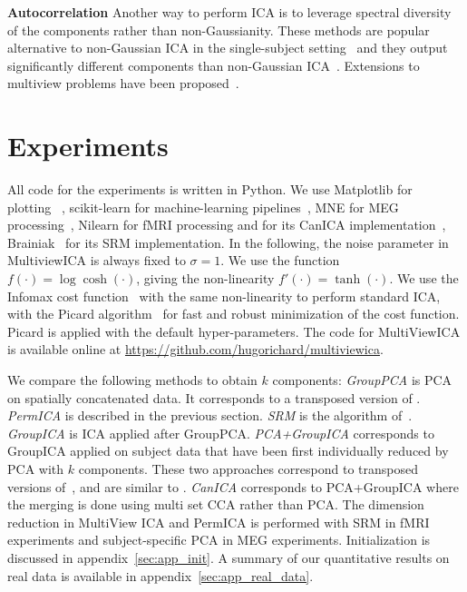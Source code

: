 \documentclass[12pt]{report}
\begin{document}
\textbf{Autocorrelation} Another way to perform ICA is to leverage spectral diversity of the components rather than non-Gaussianity.
%
These methods are popular alternative to non-Gaussian ICA in the single-subject setting~\cite{tong1991indeterminacy, belouchrani1997blind, pham1997blind} and they output significantly different components than non-Gaussian ICA~\cite{delorme2012independent}.
%
Extensions to multiview problems have been proposed~\cite{lukic2002ica, congedo2010group}.
\vspace{-5pt}
%
%
\section{Experiments}
\label{sec:expts}
All code for the experiments is written in Python.
%
We use Matplotlib for plotting~\cite{hunter2007matplotlib} , scikit-learn for
machine-learning pipelines~\cite{pedregosa2011scikit}, MNE for MEG
processing~\cite{gramfort2013meg}, Nilearn for fMRI processing and for its CanICA implementation~\cite{abraham2014machine}, Brainiak~\cite{kumar2020brainiak} for its SRM implementation. 
%
In the following, the noise parameter in MultiviewICA is always fixed to $\sigma =1$.
%
We use the function $f(\cdot)= \log\cosh(\cdot)$, giving the non-linearity $f'(\cdot) = \tanh(\cdot)$.
%
We use the Infomax cost function~\cite{bell1995information} with the same non-linearity to perform standard ICA, with the Picard algorithm~\cite{ablin2018faster} for fast and robust minimization of the cost function. Picard is applied with the default hyper-parameters.
%
The code for MultiViewICA is available online at \url{https://github.com/hugorichard/multiviewica}.
%

We compare the following methods to obtain $k$ components:
%
\emph{GroupPCA} is PCA on spatially concatenated data. It corresponds to a transposed version of \cite{smith2014group}.
%
\emph{PermICA} is described in the previous section.
%
\emph{SRM} is  the algorithm of~\cite{chen2015reduced}.
%
\emph{GroupICA} is ICA applied after GroupPCA.
%
\emph{PCA+GroupICA} corresponds to GroupICA applied on subject data that have been first individually reduced by PCA with $k$ components. 
%
These two approaches correspond to transposed versions of~\cite{calhoun2001fmri}, and are similar to \cite{eichele2011eegift}.
\emph{CanICA} corresponds to PCA+GroupICA where the merging is done using multi set CCA rather than PCA. The dimension reduction in MultiView ICA and PermICA is performed with SRM in fMRI experiments and subject-specific PCA in MEG experiments. Initialization is discussed in appendix~\ref{sec:app_init}. A summary of our quantitative results on real data is available in appendix~\ref{sec:app_real_data}.
\end{document}
